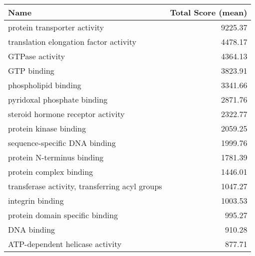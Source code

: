 \begin{table}[hp]
\begin{center} \sf
\begin{tabular}{p{}r}
\toprule
\textbf{Name}                                                 & \textbf{Total Score (mean)} \\ \midrule
protein transporter activity                                  & 9225.37                     \\
translation elongation factor activity                        & 4478.17                     \\ %
GTPase activity                                               & 4364.13                     \\
GTP binding                                                   & 3823.91                     \\
phospholipid binding                                          & 3341.66                     \\
pyridoxal phosphate binding                                   & 2871.76                     \\
steroid hormone receptor activity                             & 2322.77                     \\ %
protein kinase binding                                        & 2059.25                     \\
sequence-specific DNA binding                                 & 1999.76                     \\ %
protein N-terminus binding                                    & 1781.39                     \\
protein complex binding                                       & 1446.01                     \\
transferase activity, transferring acyl groups                & 1047.27                     \\
integrin binding                                              & 1003.53                     \\
protein domain specific binding                               & 995.27                      \\
DNA binding                                                   & 910.28                      \\ %
ATP-dependent helicase activity                               & 877.71                      \\

\end{tabular}
\end{center}
\end{table}
